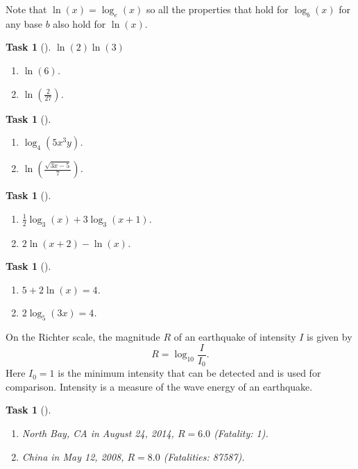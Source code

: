 \documentclass[10pt,]{article}
\theoremstyle{plain}
\newtheorem{proposition}[theorem]{Task}
\theoremstyle{definition}
\numberwithin{equation}{section}
\begin{document}
\hypertarget{p-88}{}%
Note that \(\ln(x) = \log_e(x)\) so all the properties that hold for \(\log_b(x)\) for any base \(b\) also hold for \(\ln(x)\).%
\begin{proposition}[{}]\label{proposition-30}
\(\ln(2)\)\(\ln(3)\)\leavevmode%
\begin{enumerate}
\item\hypertarget{li-168}{}\(\ln(6)\).%
\item\hypertarget{li-169}{}\(\ln(\frac{2}{27})\).%
\end{enumerate}
\end{proposition}
\begin{proposition}[{}]\label{proposition-31}
\leavevmode%
\begin{enumerate}
\item\hypertarget{li-170}{}\(\log_4 (5x^3y)\).%
\item\hypertarget{li-171}{}\(\ln(\frac{\sqrt{3x-5}}{7})\).%
\end{enumerate}
\end{proposition}
\begin{proposition}[{}]\label{proposition-32}
\leavevmode%
\begin{enumerate}
\item\hypertarget{li-172}{}\(\frac{1}{2}\log_3(x)+3\log_3(x+1)\).%
\item\hypertarget{li-173}{}\(2\ln(x+2)-\ln(x)\).%
\end{enumerate}
\end{proposition}
\begin{proposition}[{}]\label{proposition-33}
\leavevmode%
\begin{enumerate}
\item\hypertarget{li-174}{}\(5+2\ln(x)=4\).%
\item\hypertarget{li-175}{}\(2\log_5(3x)=4\).%
\end{enumerate}
\end{proposition}
\hypertarget{p-89}{}%
On the Richter scale, the magnitude \(R\) of an earthquake of intensity \(I\) is given by%
\begin{equation*}
R = \log_{10} \frac{I}{I_0}.
\end{equation*}
Here \(I_0=1\) is the minimum intensity that can be detected and is used for comparison. Intensity is a measure of the wave energy of an earthquake.%
\begin{proposition}[{}]\label{proposition-34}
\leavevmode%
\begin{enumerate}
\item\hypertarget{li-176}{}North Bay, CA in August 24, 2014, \(R=6.0\) (Fatality: 1).%
\item\hypertarget{li-177}{}China in May 12, 2008, \(R=8.0\) (Fatalities: 87587).%
\end{enumerate}
\end{proposition}
\end{document}
